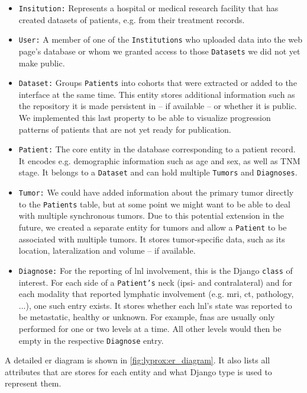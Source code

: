 \documentclass[\relativeRoot/main.tex]{subfiles}
\begin{document}
\begin{itemize}
    \item \texttt{Insitution:} Represents a hospital or medical research facility that has created datasets of patients, e.g. from their treatment records.
    \item \texttt{User:} A member of one of the \texttt{Institutions} who uploaded data into the web page's database or whom we granted access to those \texttt{Datasets} we did not yet make public.
    \item \texttt{Dataset:} Groups \texttt{Patients} into cohorts that were extracted or added to the interface at the same time. This entity stores additional information such as the repository it is made persistent in -- if available -- or whether it is public. We implemented this last property to be able to visualize progression patterns of patients that are not yet ready for publication.
    \item \texttt{Patient:} The core entity in the database corresponding to a patient record. It encodes e.g. demographic information such as age and sex, as well as TNM stage. It belongs to a \texttt{Dataset} and can hold multiple \texttt{Tumors} and \texttt{Diagnoses}.
    \item \texttt{Tumor:} We could have added information about the primary tumor directly to the \texttt{Patients} table, but at some point we might want to be able to deal with multiple synchronous tumors. Due to this potential extension in the future, we created a separate entity for tumors and allow a \texttt{Patient} to be associated with multiple tumors. It stores tumor-specific data, such as its location, lateralization and volume -- if available.
    \item \texttt{Diagnose:} For the reporting of \acrlong{lnl} involvement, this is the Django \texttt{class} of interest. For each side of a \texttt{Patient's} neck (ipsi- and contralateral) and for each modality that reported lymphatic involvement (e.g. \gls{mri}, \gls{ct}, pathology, ...), one such entry exists. It stores whether each \gls{lnl}'s state was reported to be metastatic, healthy or unknown. For example, \glspl{fna} are usually only performed for one or two levels at a time. All other levels would then be empty in the respective \texttt{Diagnose} entry.
\end{itemize}

A detailed \gls{er} diagram is shown in \cref{fig:lyprox:er_diagram}. It also lists all attributes that are stores for each entity and what Django type is used to represent them.
\end{document}
